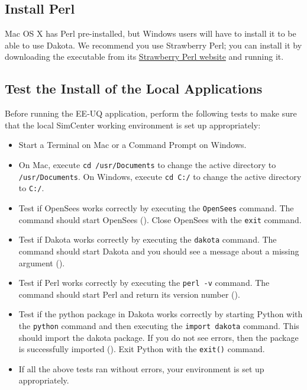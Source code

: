 \subsection{Install  Perl}

Mac OS X has Perl pre-installed, but Windows users will have to
install it to be able to use Dakota. We recommend you use Strawberry
Perl; you can install it by downloading the executable from
its \href{http://strawberryperl.com}{Strawberry Perl website} and
running it.

\subsection{Test the Install of the Local Applications}

Before running the EE-UQ application, perform the following tests to
make sure that the local SimCenter working environment is set up
appropriately:

\begin{itemize}
    \item Start a Terminal on Mac or a Command Prompt on Windows.
    \item On Mac, execute \texttt{cd /usr/Documents} to change the active directory to \texttt{/usr/Documents}. On Windows, execute \texttt{cd C:/} to change the active directory to \texttt{C:/}.
    \item Test if OpenSees works correctly by executing the \texttt{OpenSees} command. The command should start OpenSees (). Close OpenSees with the \texttt{exit} command.
    \item Test if Dakota works correctly by executing the \texttt{dakota} command. The command should start Dakota and you should see a message about a missing argument ().
    \item Test if Perl works correctly by executing the \texttt{perl -v} command. The command should start Perl and return its version number ().
    \item Test if the python package in Dakota works correctly by starting Python with the \texttt{python} command and then executing the \texttt{import dakota} command. This should import the dakota package. If you do not see errors, then the package is successfully imported (). Exit Python with the \texttt{exit()} command.
    \item If all the above tests ran without errors, your environment is set up appropriately.
\end{itemize}

